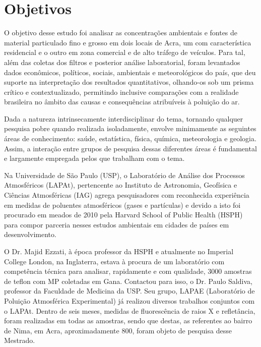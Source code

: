 \section{Objetivos}

O objetivo desse estudo foi analisar as concentrações ambientais e fontes de 
material particulado fino e grosso em dois locais de Acra, um com característica
residencial e o outro em zona comercial e de alto tráfego de veículos. 
Para tal, além das coletas dos filtros e posterior análise laboratorial, 
foram levantados dados econômicos, políticos, sociais, ambientais e 
meteorológicos do país, que deu suporte na interpretação dos resultados 
quantitativos, olhando-os sob um prisma crítico e contextualizado, permitindo
inclusive comparações com a realidade brasileira no âmbito das causas e 
consequências atribuíveis à poluição do ar.

Dada a natureza intrinsecamente interdisciplinar do tema, tornando qualquer 
pesquisa pobre quando realizada isoladamente, envolve minimamente as seguintes 
áreas de conhecimento: saúde, estatística, física, química, meteorologia e 
geologia. Assim, a interação entre grupos de pesquisa dessas diferentes áreas 
é fundamental e largamente empregada pelos que trabalham com o tema.

Na Universidade de São Paulo (USP), o Laboratório de Análise dos Processos 
Atmosféricos (LAPAt), pertencente ao Instituto de Astronomia, Geofísica e 
Ciências Atmosféricas (IAG) agrega pesquisadores com reconhecida experiência em 
medidas de poluentes atmosféricos (gases e partículas) e devido a isto foi 
procurado em meados de 2010 pela Harvard School of Public Health (HSPH) para 
compor parceria nesses estudos ambientais em cidades de países em desenvolvimento. 

O Dr. Majid Ezzati, à época professor da HSPH e atualmente no Imperial College 
London, na Inglaterra, estava à procura de um laboratório com competência 
técnica para analisar, rapidamente e com qualidade, 3000 amostras de teflon 
com MP coletadas em Gana. Contactou para isso, o Dr. Paulo Saldiva, professor 
da Faculdade de Medicina da USP. Seu grupo, LAPAE 
(Laboratório de Poluição Atmosférica Experimental) já realizou diversos trabalhos
conjuntos com o LAPAt. Dentro de seis meses, medidas de fluorescência de raios X e 
refletância, foram realizadas em todas as amostras, sendo que destas, as referentes
ao bairro de Nima, em Acra, aproximadamente 800, foram objeto de pesquisa desse
Mestrado.  

